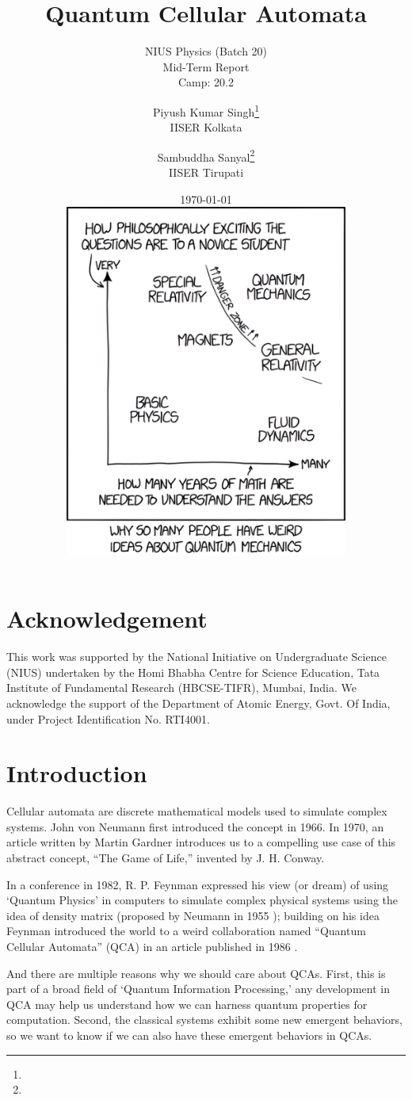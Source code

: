 \documentclass[11pt, oneside]{scrbook}
\title{Quantum Cellular Automata}
\subtitle{NIUS Physics (Batch 20) \\ Mid-Term Report \\ Camp: 20.2}
\author{
    Piyush Kumar Singh\thanks{\mailto{pks22ms027@iiserkol.ac.in}} \\ {\large IISER Kolkata} 
    \and
    Sambuddha Sanyal\thanks{\mailto{sambuddha.sanyal@iisertirupati.ac.in}} \\ {\large IISER Tirupati}
}
\date{
    \today \\[6ex]
    \includegraphics[width = 0.7\textwidth]{quantum-xkcd-better.png}
}
\begin{document}
\frontmatter
\begin{titlepage}
    \let\newpage\relax%
    \singhtitle
\end{titlepage}

\chapter*{Acknowledgement}

{\large\noindent
    This work was supported by the National Initiative on Undergraduate Science (NIUS) undertaken
    by the Homi Bhabha Centre for Science Education, Tata Institute of Fundamental Research
    (HBCSE-TIFR), Mumbai, India. We acknowledge the support of the Department of Atomic
    Energy, Govt. Of India, under Project Identification No. RTI4001.}

\tableofcontents

\mainmatter

\chapter{Introduction}


Cellular automata are discrete mathematical models used to simulate complex systems. John von Neumann first introduced the concept \cite{Neumann1966} in 1966. In 1970, an article written by Martin Gardner \cite{Gardner1970} introduces us to a compelling use case of this abstract concept, ``The Game of Life,'' invented by J. H. Conway.


In a conference in 1982, R. P. Feynman expressed his view (or dream) of using `Quantum Physics' in computers \cite{Feynman1982} to simulate complex physical systems using the idea of density matrix (proposed by Neumann in 1955 \cite{Neumann2018}); building on his idea Feynman introduced the world to a weird collaboration named ``Quantum Cellular Automata'' (QCA) in an article published in 1986 \cite{Feynman1986}.

And there are multiple reasons why we should care about QCAs. First, this is part of a broad field of `Quantum Information Processing,' any development in QCA may help us understand how we can harness quantum properties for computation. Second, the classical systems exhibit some new emergent behaviors, so we want to know if we can also have these emergent behaviors in QCAs.
\end{document}
